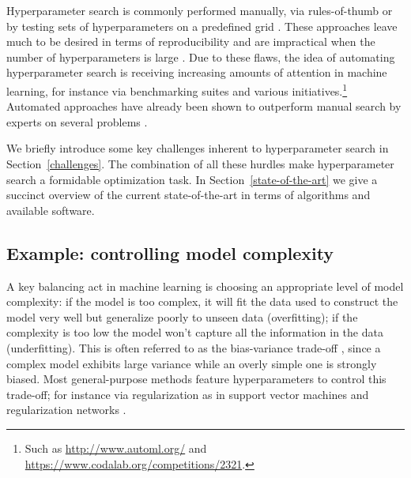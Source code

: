 \documentclass{mic2015}
\begin{document}
Hyperparameter search is commonly performed manually, via rules-of-thumb \citep{hsu2003practical,hinton2012practical} or by testing sets of hyperparameters on a predefined grid \citep{pedregosa2011scikit}. These approaches leave much to be desired in terms of reproducibility and are impractical when the number of hyperparameters is large \citep{DBLP:journals/corr/ClaesenSPMM14}. Due to these flaws, the idea of automating hyperparameter search is receiving increasing amounts of attention in  machine learning, for instance via benchmarking suites \citep{eggensperger2013towards} and various initiatives.\footnote{Such as \url{http://www.automl.org/} and \url{https://www.codalab.org/competitions/2321}.} %
Automated approaches have already been shown to outperform manual search by experts on several problems \citep{ bergstra2011algorithms,bergstra2012random}. 

We briefly introduce some key challenges inherent to hyperparameter search in Section~\ref{challenges}. The combination of all these hurdles make hyperparameter search a formidable optimization task. In Section~\ref{state-of-the-art} we give a succinct overview of the current state-of-the-art in terms of algorithms and available software.

\subsection{Example: controlling model complexity}
A key balancing act in machine learning is choosing an appropriate level of model complexity: if the model is too complex, it will fit the data used to construct the model very well but generalize poorly to unseen data (overfitting); if the complexity is too low the model won't capture all the information in the data (underfitting). This is often referred to as the bias-variance trade-off \citep{geman1992neural, cucker2002best}, since a complex model exhibits large variance while an overly simple one is strongly biased. Most general-purpose methods feature hyperparameters to control this trade-off; for instance via regularization as in support vector machines and regularization networks \citep{evgeniou2000regularization,hastie2004entire}.
\end{document}
